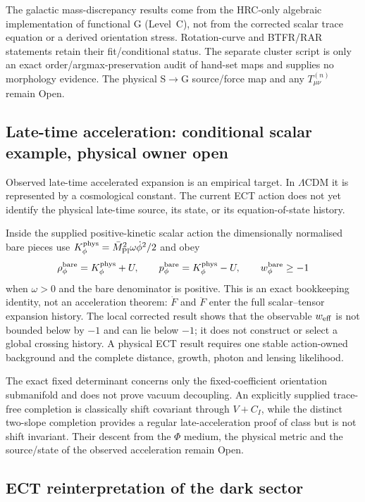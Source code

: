 \documentclass[11pt,a4paper]{article}
\begin{document}
The galactic mass-discrepancy results come from the HRC-only algebraic implementation of functional G (Level~C), not from the corrected scalar trace equation or a derived orientation stress.  Rotation-curve and BTFR/RAR statements retain their fit/conditional status.  The separate cluster script is only an exact order/argmax-preservation audit of hand-set maps and supplies no morphology evidence.  The physical S$\to$G source/force map and any $T^{(n)}_{\mu\nu}$ remain Open.


\subsection{Late-time acceleration: conditional scalar example, physical owner open}

Observed late-time accelerated expansion is an empirical target.  In
$\Lambda$CDM it is represented by a cosmological constant.  The current ECT
action does not yet identify the physical late-time source, its state, or its
equation-of-state history.

Inside the supplied positive-kinetic scalar action the dimensionally
normalised bare pieces use
$K_\phi^{\rm phys}=\bar M_{\rm Pl}^2\omega\dot\phi^2/2$ and obey
\[
 \rho_\phi^{\rm bare}=K_\phi^{\rm phys}+U,\qquad
 p_\phi^{\rm bare}=K_\phi^{\rm phys}-U,\qquad
 w_\phi^{\rm bare}\ge-1
\]
when $\omega>0$ and the bare denominator is positive.  This is an exact
bookkeeping identity, not an acceleration theorem: $\dot F$ and $\ddot F$
enter the full scalar--tensor expansion history.  The local corrected result
shows that the observable $w_{\rm eff}$ is not bounded below by $-1$ and can
lie below $-1$; it does not construct or select a global crossing history.
A physical ECT result requires one stable action-owned background and the
complete distance, growth, photon and lensing likelihood.

The exact fixed determinant concerns only the fixed-coefficient
orientation submanifold and does not prove vacuum decoupling.  An explicitly
supplied trace-free completion is classically shift covariant through
$V+C_I$, while the distinct two-slope completion provides a regular
late-acceleration proof of class but is not shift invariant.  Their descent
from the $\Phi$ medium, the physical metric and the source/state of the
observed acceleration remain Open.

\subsection{ECT reinterpretation of the dark sector}
\end{document}
